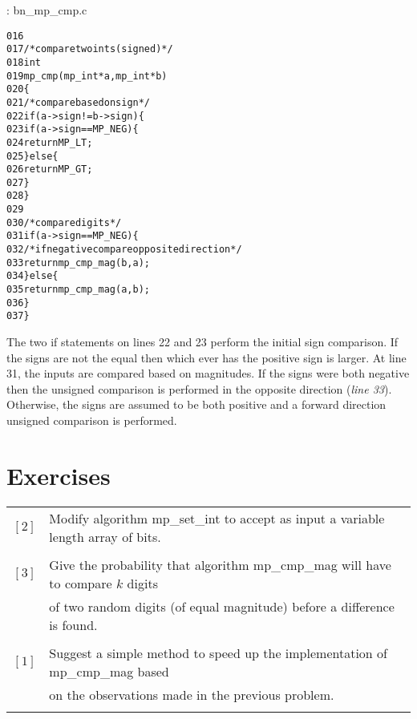 \documentclass[b5paper]{book}
\begin{document}
\vspace{+3mm}\begin{small}
\hspace{-5.1mm}{\bf File}: bn\_mp\_cmp.c
\vspace{-3mm}
\begin{alltt}
016   
017   /* compare two ints (signed)*/
018   int
019   mp_cmp (mp_int * a, mp_int * b)
020   \{
021     /* compare based on sign */
022     if (a->sign != b->sign) \{
023        if (a->sign == MP_NEG) \{
024           return MP_LT;
025        \} else \{
026           return MP_GT;
027        \}
028     \}
029     
030     /* compare digits */
031     if (a->sign == MP_NEG) \{
032        /* if negative compare opposite direction */
033        return mp_cmp_mag(b, a);
034     \} else \{
035        return mp_cmp_mag(a, b);
036     \}
037   \}
\end{alltt}
\end{small}

The two if statements on lines 22 and 23 perform the initial sign comparison.  If the signs are not the equal then which ever
has the positive sign is larger.   At line 31, the inputs are compared based on magnitudes.  If the signs were both negative then 
the unsigned comparison is performed in the opposite direction (\textit{line 33}).  Otherwise, the signs are assumed to 
be both positive and a forward direction unsigned comparison is performed.

\section*{Exercises}
\begin{tabular}{cl}
$\left [ 2 \right ]$ & Modify algorithm mp\_set\_int to accept as input a variable length array of bits. \\
                     & \\
$\left [ 3 \right ]$ & Give the probability that algorithm mp\_cmp\_mag will have to compare $k$ digits  \\
                     & of two random digits (of equal magnitude) before a difference is found. \\
                     & \\
$\left [ 1 \right ]$ & Suggest a simple method to speed up the implementation of mp\_cmp\_mag based  \\
                     & on the observations made in the previous problem. \\
                     &
\end{tabular}
\end{document}
